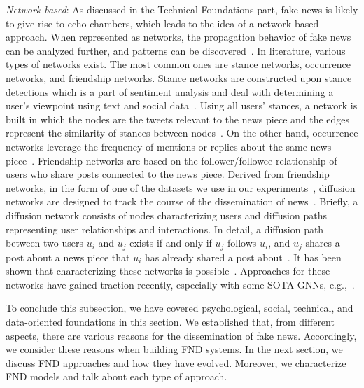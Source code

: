 \begin{description}
    \item{\emph{Network-based}:} As discussed in the Technical Foundations part, fake news is likely to give rise to echo chambers, which leads to the idea of a network-based approach. When represented as networks, the propagation behavior of fake news can be analyzed further, and patterns can be discovered~\parencite{FakeNewsDetectionOnSocialMediaADataMiningPerspective_Shu}. In literature, various types of networks exist. The most common ones are stance networks, occurrence networks, and friendship networks. Stance networks are constructed upon stance detections which is a part of sentiment analysis and deal with determining a user’s viewpoint using text and social data~\parencite{StanceClassificationAttention_Du}. Using all users’ stances, a network is built in which the nodes are the tweets relevant to the news piece and the edges represent the similarity of stances between nodes~\parencite{NewsVerificationByExploitingConflictingSocialViewpoints_Jin, SomeLikeItHoaxDataset_Tacchini}. On the other hand, occurrence networks leverage the frequency of mentions or replies about the same news piece~\parencite{ProminentFeaturesOfRumorPropagation_Kwon}. Friendship networks are based on the follower/followee relationship of users who share posts connected to the news piece. Derived from friendship networks, in the form of one of the datasets we use in our experiments~\parencite{UPFD_Dataset_Shu}, diffusion networks are designed to track the course of the dissemination of news~\parencite{ProminentFeaturesOfRumorPropagation_Kwon}. Briefly, a diffusion network consists of nodes characterizing users and diffusion paths representing user relationships and interactions. In detail, a diffusion path between two users $u_i$ and $u_j$ exists if and only if $u_j$ follows $u_i$, and $u_j$ shares a post about a news piece that $u_i$ has already shared a post about~\parencite{FakeNewsDetectionOnSocialMediaADataMiningPerspective_Shu}. It has been shown that characterizing these networks is possible~\parencite{ProminentFeaturesOfRumorPropagation_Kwon}. Approaches for these networks have gained traction recently, especially with some SOTA GNNs, e.g.,~\parencite{FakeNewsDetectionUsingGeometricDeepLearning_Monti}.
\end{description}
To conclude this subsection, we have covered psychological, social, technical, and data-oriented foundations in this section. We established that,  from different aspects, there are various reasons for the dissemination of fake news. Accordingly, we consider these reasons when building FND systems. In the next section, we discuss FND approaches and how they have evolved. Moreover, we characterize FND models and talk about each type of approach.

